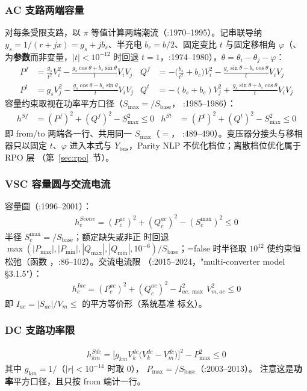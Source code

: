\subsubsection*{AC 支路两端容量}
对每条受限支路，以 $\pi$ 等值计算两端潮流（:1970--1995）。记串联导纳
$y_s=1/(r+jx)=g_s+jb_s$、半充电 $b_c=b/2$、固定变比 $t$ 与固定移相角
$\varphi$（、 为\textbf{参数}而非变量，$|t|<10^{-12}$
时回退 $t=1$，:1974--1980），$\theta=\theta_i-\theta_j-\varphi$：
\begin{align*}
P^{f}&=\frac{g_s}{t^2}V_i^2-\frac{g_s\cos\theta+b_s\sin\theta}{t}V_iV_j
&Q^{f}&=-\Big(\frac{b_s}{t^2}+b_c\Big)V_i^2-\frac{g_s\sin\theta-b_s\cos\theta}{t}V_iV_j\\
P^{t}&=g_sV_j^2-\frac{g_s\cos\theta-b_s\sin\theta}{t}V_iV_j
&Q^{t}&=-(b_s+b_c)V_j^2+\frac{g_s\sin\theta+b_s\cos\theta}{t}V_iV_j
\end{align*}
容量约束取视在功率平方口径（$S_{\max}=$$/S_{\mathrm{base}}$，
:1985--1986）：
\begin{align*}
h^{Sf}&=(P^{f})^2+(Q^{f})^2-S_{\max}^2\le 0
&h^{St}&=(P^{t})^2+(Q^{t})^2-S_{\max}^2\le 0
\end{align*}
即 from/to 两端各一行、共用同一 $S_{\max}$（$=$，
:489--490）。变压器分接头与移相器只以固定 $t$、$\varphi$ 进入本式与
$Y_{\mathrm{bus}}$，Parity NLP 不优化档位；离散档位优化属于 RPO 层
（第~\ref{sec:rpo}~节）。

\subsubsection*{VSC 容量圆与交流电流}
容量圆（:1996--2001）：
\begin{align*}
h^{Sconv}_c=(P^{ac}_c)^2+(Q^{ac}_c)^2-(S^{\max}_c)^2\le 0
\end{align*}
半径 $S^{\max}_c=$$/S_{\mathrm{base}}$；额定缺失或非正
时回退 $\max(|P_{\max}|,|P_{\min}|,|Q_{\max}|,|Q_{\min}|,10^{-6})/
S_{\mathrm{base}}$；=false 时半径取
$10^{12}$ 使约束恒松弛（函数 ，:86--102）。交流电流限
（:2015--2024，"multi-converter model §3.1.5"）：
\begin{align*}
h^{Iac}_c=(P^{ac}_c)^2+(Q^{ac}_c)^2-I^{2}_{ac,\max}\,V_{m,ac}^2\le 0
\end{align*}
即 $I_{ac}=|S_{ac}|/V_m\le$ 的平方等价形（系统基准
标幺）。

\subsubsection*{DC 支路功率限}
\begin{align*}
h^{Sdc}_{km}=\Big[g_{km}V^{dc}_k\big(V^{dc}_k-V^{dc}_m\big)\Big]^2-P_{\max}^2\le 0
\end{align*}
其中 $g_{km}=1/$（$|r|<10^{-14}$ 时取 0），
$P_{\max}=$$/S_{\mathrm{base}}$（:2003--2013）。
注意这是\textbf{功率}平方口径，且只按 from 端计一行。

